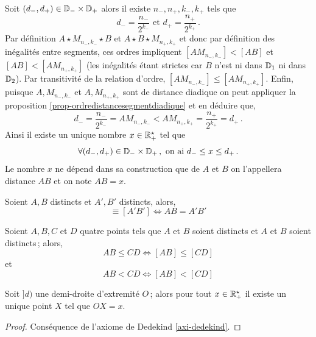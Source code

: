 Soit $(d_-,d_+)\in \mathbb{D}_- \times \mathbb{D}_+$ alors il existe $n_-,n_+, k_-, k_+$ tels que $$d_- = \dfrac{n_-}{2^{k_-}} \text{ et } d_+ = \dfrac{n_+}{2^{k_+}}\,.$$ Par définition $A\star M_{n_-,k_-} \star B$ et $A\star B \star M_{n_+,k_+}$ et donc par définition des inégalités entre segments, ces ordres impliquent $[AM_{n_-,k_-}]< [AB]$ et $[AB] < [AM_{n_+,k_+}]$ (les inégalités étant strictes car $B$ n'est ni dans $\mathbb{D}_1$ ni dans $\mathbb{D}_2$). Par transitivité de la relation d'ordre, $[A M_{n_-,k_-}]\leq [AM_{n_+,k_+}]$. Enfin, puisque $A,M_{n_-,k_-}$ et $A,M_{n_+,k_+}$ sont de distance diadique on peut appliquer la proposition \ref{prop-ordredistancesegmentdiadique} et en déduire que,
\begin{equation*}
    d_- = \dfrac{n_-}{2^{k_-}} = A M_{n_-,k_-} < AM_{n_+,k_+} = \dfrac{n_+}{2^{k_+}} = d_+\,.
\end{equation*}
Ainsi il existe un unique nombre $x\in \mathbb{R}_+^\star$ tel que 
\begin{equation*}
    \forall (d_-,d_+)\in \mathbb{D}_- \times \mathbb{D}_+\,, \text{ on ai } d_- \leq x \leq d_+\,.
\end{equation*}
Le nombre $x$ ne dépend dans sa construction que de $A$ et $B$ on l'appellera distance $AB$ et on note $AB=x$.
\begin{prop}
    Soient $A,B$ distincts et $A',B'$ distincts, alors,
    \begin{equation*}
        [AB]\equiv[A'B'] \Longleftrightarrow AB = A'B'
    \end{equation*}
\end{prop}
\begin{prop}
        Soient $A,B,C$ et $D$ quatre points tels que $A$ et $B$ soient distincts et $A$ et $B$ soient distincts\,; alors,
    \begin{equation*}
        AB \leq CD \Longleftrightarrow [AB]\leq[CD]
    \end{equation*}
    et 
    \begin{equation*}
        AB <CD \Longleftrightarrow [AB]<[CD]
    \end{equation*}
\end{prop}
\begin{thm}
    Soit $]d)$ une demi-droite d'extremité $O$\,; alors pour tout $x \in \mathbb{R}_+^\star$ il existe un unique point $X$ tel que $OX = x$.
\begin{proof}
    Conséquence de l'axiome de Dedekind \ref{axi-dedekind}.
\end{proof}
\end{thm}

